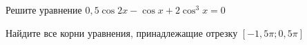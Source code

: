 \begin{ex}
	\begin{condition}
		\begin{enumcols}[label=\asbuk*)]
			\item Решите уравнение \( 0,5\cos 2x  - \cos x + 2\cos^3 x= 0 \)
			\item Найдите все корни уравнения, принадлежащие отрезку \( \left[-1,5\pi;0,5\pi\right]  \)
		\end{enumcols}
	\end{condition}
\end{ex}